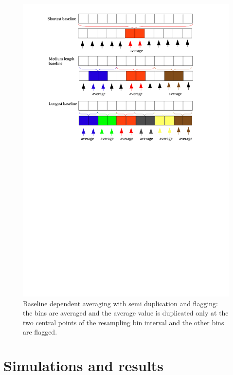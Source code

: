 \documentclass[useAMS,usenatbib]{mn2e}
\begin{document}
\begin{figure}
\includegraphics[width=\columnwidth]{./Figures/bda_averaging_semi_duplication_flaggin_senario1.pdf}
\caption{Baseline dependent averaging with semi duplication and flagging: the bins are averaged and the average
value is duplicated only at the two central points of the resampling bin interval and the other bins are flagged.}\label{fig:bdavgsimeduplicationflagging}
\end{figure}

\section{Simulations and results} 
\end{document}
